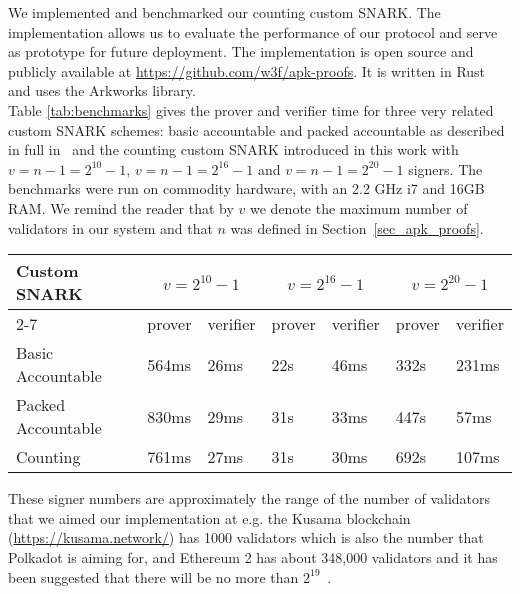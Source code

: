 \noindent We implemented and benchmarked our counting custom SNARK. 
The implementation allows us to evaluate the performance of our protocol 
and serve as prototype for future deployment. The implementation 
is open source and publicly available at \url{https://github.com/w3f/apk-proofs}. 
It is written in Rust and uses the Arkworks library. \\

\noindent Table \ref{tab:benchmarks} gives the prover and verifier time for three very related custom 
SNARK schemes: basic accountable and  packed accountable as described in 
full in~\cite{LC_paper} and the counting custom SNARK introduced in this work 
with $v = n-1 = 2^{10}-1$, $v = n-1 = 2^{16}-1$ and $v=n-1=2^{20}-1$ signers. 
The benchmarks were run on commodity hardware, with an 2.2 GHz i7 and 16GB RAM. 
We remind the reader that by $v$ we denote the maximum number of validators in our 
system and that $n$ was defined in Section~\ref{sec_apk_proofs}.\\

\begin{table*}[h!]
\hfill
\begin{tabular}{| l | l | l | l | l |l | l |}
\hline
 Custom SNARK & \multicolumn{2}{|c|}{$v = 2^{10}-1$} & \multicolumn{2}{|c|}{$v = 2^{16}-1$} & \multicolumn{2}{|c|}{$v = 2^{20}-1$}     \\
\cline{2-7}
 &  prover & verifier & prover & verifier &  prover & verifier \\
\hline

Basic Accountable & 564ms & 26ms & 22s & 46ms & 332s & 231ms \\
Packed Accountable & 830ms & 29ms & 31s & 33ms & 447s & 57ms \\
Counting            & 761ms & 27ms & 31s & 30ms & 692s & 107ms \\
\hline
\end{tabular}
\caption{Proof and verifier times for the different schemes and numbers of signers}
\label{tab:benchmarks}
\end{table*}


\noindent These signer numbers are approximately the range of the number of validators that we aimed our implementation at e.g. the Kusama blockchain (\url{https://kusama.network/}) has 1000 validators which is also the number that Polkadot is aiming for, and Ethereum 2 has about 348,000 validators and it has been suggested that there will be no more than $2^{19}$~\cite{ethresearch1}. \\

